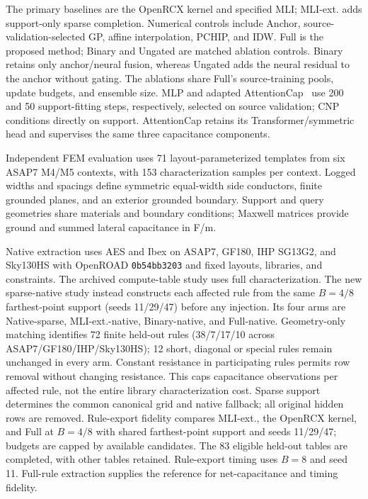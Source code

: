 \documentclass[conference,9pt,letterpaper]{IEEEtran}
\begin{document}
The primary baselines are the OpenRCX kernel and specified MLI; MLI-ext. adds support-only sparse completion. Numerical controls include Anchor, source-validation-selected GP, affine interpolation, PCHIP, and IDW. Full is the proposed method; Binary and Ungated are matched ablation controls. Binary retains only anchor/neural fusion, whereas Ungated adds the neural residual to the anchor without gating. The ablations share Full's source-training pools, update budgets, and ensemble size. MLP and adapted AttentionCap~\cite{attentioncode} use 200 and 50 support-fitting steps, respectively, selected on source validation; CNP conditions directly on support. AttentionCap retains its Transformer/symmetric head and supervises the same three capacitance components.

Independent FEM evaluation uses 71 layout-parameterized templates from six ASAP7 M4/M5 contexts, with 153 characterization samples per context. Logged widths and spacings define symmetric equal-width side conductors, finite grounded planes, and an exterior grounded boundary. Support and query geometries share materials and boundary conditions; Maxwell matrices provide ground and summed lateral capacitance in F/m.

Native extraction uses AES and Ibex on ASAP7, GF180, IHP SG13G2, and Sky130HS with OpenROAD \texttt{0b54bb3203} and fixed layouts, libraries, and constraints. The archived compute-table study uses full characterization. The new
sparse-native study instead constructs each affected rule from the same
$B=4/8$ farthest-point support (seeds 11/29/47) before any injection.
Its four arms are Native-sparse, MLI-ext.-native, Binary-native, and
Full-native. Geometry-only matching identifies 72 finite held-out rules
(38/7/17/10 across ASAP7/GF180/IHP/Sky130HS); 12 short, diagonal or
special rules remain unchanged in every arm. Constant resistance in
participating rules permits row removal without changing resistance.
This caps capacitance observations per affected rule, not the entire
library characterization cost. Sparse support determines the common
canonical grid and native fallback; all original hidden rows are removed.
Rule-export fidelity compares MLI-ext., the OpenRCX kernel, and Full at $B=4/8$ with shared farthest-point support and seeds 11/29/47; budgets are capped by available candidates. The 83 eligible held-out tables are completed, with other tables retained. Rule-export timing uses $B=8$ and seed 11. Full-rule extraction supplies the reference for net-capacitance and timing fidelity.
\end{document}
